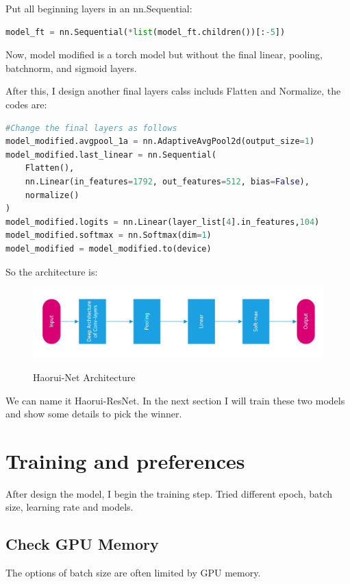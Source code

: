 \documentclass{article}
\begin{document}
Put all beginning layers in an nn.Sequential:
\begin{lstlisting}[language=Python, caption=Keep the conv2d layers]
model_ft = nn.Sequential(*list(model_ft.children())[:-5])
\end{lstlisting}
Now, model modified is a torch model but without the final linear, pooling, batchnorm, and sigmoid layers.

After this, I design another final layers calss includs Flatten and Normalize, the codes are:
\begin{lstlisting}[language=Python, caption=Haorui Net]
#Change the final layers as follows
model_modified.avgpool_1a = nn.AdaptiveAvgPool2d(output_size=1)
model_modified.last_linear = nn.Sequential(
    Flatten(),
    nn.Linear(in_features=1792, out_features=512, bias=False),
    normalize()
)
model_modified.logits = nn.Linear(layer_list[4].in_features,104)
model_modified.softmax = nn.Softmax(dim=1)
model_modified = model_modified.to(device)
\end{lstlisting}
So the architecture is:
\begin{figure}[H]%
  \centering
  \caption{Haorui-Net Architecture}
  \includegraphics[width=\columnwidth]{IMG/haoruinet.png} %
  \label{Fig.RNN} %
\end{figure}

We can name it Haorui-ResNet. In the next section I will train these two models and show some details to pick the winner.

\section{Training and preferences}
After design the model, I begin the training step. Tried different epoch, batch size, learning rate and models.

\subsection{Check GPU Memory}
The options of batch size are often limited by GPU memory.
\end{document}
